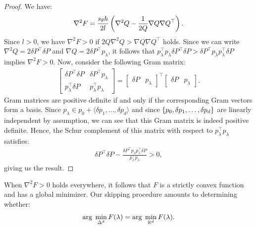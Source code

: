 \documentclass[eikonal.tex]{subfiles}
\begin{document}
\begin{proof}
  We have:
  \begin{align*}
    \nabla^2 F = \frac{s_\theta h}{2l} \left(\nabla^2 Q - \frac{1}{2 Q} \nabla Q \nabla Q^\top\right).
  \end{align*}
  Since $l > 0$, we have $\nabla^2 F > 0$ if
  $2 Q \nabla^2 Q > \nabla Q \nabla Q^\top$ holds. Since we can write
  $\nabla^2 Q = 2 \delta P^\top \delta P$ and
  $\nabla Q = 2 \delta P^\top p_\lambda$, it follows that
  $p_\lambda^\top p_\lambda \delta P^\top \delta P > \delta P^\top
  p_\lambda p_\lambda^\top \delta P$ implies $\nabla^2 F > 0$. Now,
  consider the following Gram matrix:
  \begin{align*}
    \begin{bmatrix}
      \delta P^\top \delta P & \delta P^\top p_\lambda \\
      p_\lambda^\top \delta P & p_\lambda^\top p_\lambda
    \end{bmatrix} = \begin{bmatrix}
      \delta P & p_\lambda
    \end{bmatrix}^\top \begin{bmatrix}
      \delta P & p_\lambda
    \end{bmatrix}.
  \end{align*}
  Gram matrices are positive definite if and only if the corresponding
  Gram vectors form a basis. Since
  $p_\lambda \in p_0 + \langle \delta p_1, \hdots, \delta p_d \rangle$
  and since $\left\{p_0, \delta p_1, \hdots, \delta p_d\right\}$ are linearly
  independent by assumption, we can see that this Gram matrix is
  indeed positive definite. Hence, the Schur complement of this matrix
  with respect to $p_\lambda^\top p_\lambda$ satisfies:
  \begin{align*}
    \delta P^\top \delta P - \frac{\delta P^\top p_\lambda p_\lambda^\top \delta P}{p_\lambda^\top p_\lambda} > 0,
  \end{align*}
  giving us the result.
\end{proof}

\begin{remark}
  When $\nabla^2 F > 0$ holds everywhere, it follows that $F$ is a
  strictly convex function and has a global minimizer. Our skipping
  procedure amounts to determining whether:
  \begin{align}\label{eq:minimizers-are-the-same}
    \operatorname{arg}\;\min_{\Delta^d} F(\lambda) = \operatorname{arg}\;\min_{\mathbb{R}^d} F(\lambda).
  \end{align}
\end{remark}
\end{document}
